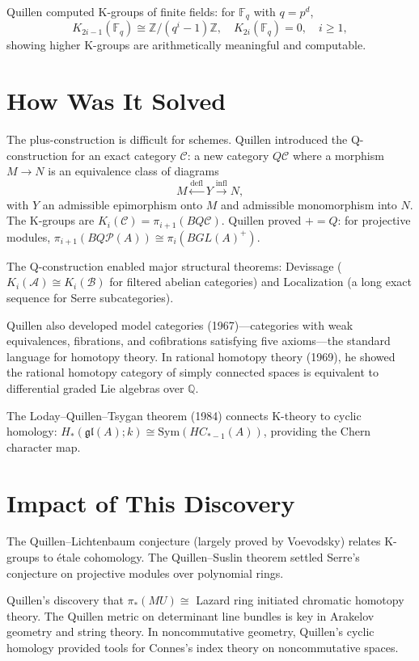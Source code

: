 Quillen computed K-groups of finite fields: for $\mathbb{F}_q$ with
$q = p^d$,
\[
K_{2i-1}(\mathbb{F}_q) \cong \mathbb{Z}/(q^i - 1)\mathbb{Z}, \quad
K_{2i}(\mathbb{F}_q) = 0, \quad i \ge 1,
\]
showing higher K-groups are arithmetically meaningful and computable.

\section{How Was It Solved}

The plus-construction is difficult for schemes. Quillen introduced the
Q-construction for an exact category $\mathcal{C}$: a new category
$Q\mathcal{C}$ where a morphism $M \to N$ is an equivalence class of
diagrams
\[
M \xleftarrow{\text{defl}} Y \xrightarrow{\text{infl}} N,
\]
with $Y$ an admissible epimorphism onto $M$ and admissible monomorphism
into $N$. The K-groups are $K_i(\mathcal{C}) = \pi_{i+1}(BQ\mathcal{C})$.
Quillen proved $+ = Q$: for projective modules,
$\pi_{i+1}(BQ\mathcal{P}(A)) \cong \pi_i(BGL(A)^+)$.

The Q-construction enabled major structural theorems: Devissage
($K_i(\mathcal{A}) \cong K_i(\mathcal{B})$ for filtered abelian
categories) and Localization (a long exact sequence for Serre
subcategories).

Quillen also developed model categories (1967)---categories with weak
equivalences, fibrations, and cofibrations satisfying five axioms---the
standard language for homotopy theory. In rational homotopy theory
(1969), he showed the rational homotopy category of simply connected
spaces is equivalent to differential graded Lie algebras over
$\mathbb{Q}$.

The Loday--Quillen--Tsygan theorem (1984) connects K-theory to cyclic
homology: $H_*(\mathfrak{gl}(A); k) \cong \mathrm{Sym}(HC_{*-1}(A))$,
providing the Chern character map.

\section{Impact of This Discovery}

The Quillen--Lichtenbaum conjecture (largely proved by Voevodsky) relates
K-groups to \'{e}tale cohomology. The Quillen--Suslin theorem settled
Serre's conjecture on projective modules over polynomial rings.

Quillen's discovery that $\pi_*(MU) \cong$ Lazard ring initiated
chromatic homotopy theory. The Quillen metric on determinant line bundles
is key in Arakelov geometry and string theory. In noncommutative geometry,
Quillen's cyclic homology provided tools for Connes's index theory on
noncommutative spaces.

